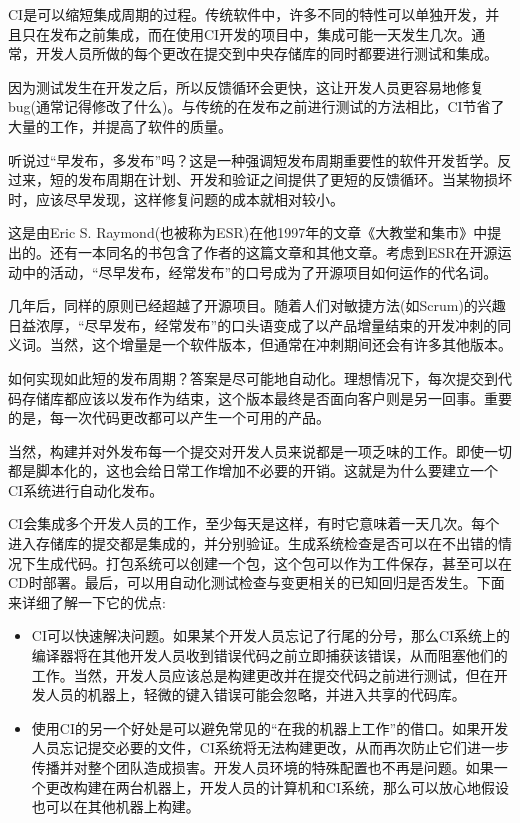 CI是可以缩短集成周期的过程。传统软件中，许多不同的特性可以单独开发，并且只在发布之前集成，而在使用CI开发的项目中，集成可能一天发生几次。通常，开发人员所做的每个更改在提交到中央存储库的同时都要进行测试和集成。

因为测试发生在开发之后，所以反馈循环会更快，这让开发人员更容易地修复bug(通常记得修改了什么)。与传统的在发布之前进行测试的方法相比，CI节省了大量的工作，并提高了软件的质量。


听说过“早发布，多发布”吗？这是一种强调短发布周期重要性的软件开发哲学。反过来，短的发布周期在计划、开发和验证之间提供了更短的反馈循环。当某物损坏时，应该尽早发现，这样修复问题的成本就相对较小。

这是由Eric S. Raymond(也被称为ESR)在他1997年的文章《大教堂和集市》中提出的。还有一本同名的书包含了作者的这篇文章和其他文章。考虑到ESR在开源运动中的活动，“尽早发布，经常发布”的口号成为了开源项目如何运作的代名词。

几年后，同样的原则已经超越了开源项目。随着人们对敏捷方法(如Scrum)的兴趣日益浓厚，“尽早发布，经常发布”的口头语变成了以产品增量结束的开发冲刺的同义词。当然，这个增量是一个软件版本，但通常在冲刺期间还会有许多其他版本。

如何实现如此短的发布周期？答案是尽可能地自动化。理想情况下，每次提交到代码存储库都应该以发布作为结束，这个版本最终是否面向客户则是另一回事。重要的是，每一次代码更改都可以产生一个可用的产品。

当然，构建并对外发布每一个提交对开发人员来说都是一项乏味的工作。即使一切都是脚本化的，这也会给日常工作增加不必要的开销。这就是为什么要建立一个CI系统进行自动化发布。


CI会集成多个开发人员的工作，至少每天是这样，有时它意味着一天几次。每个进入存储库的提交都是集成的，并分别验证。生成系统检查是否可以在不出错的情况下生成代码。打包系统可以创建一个包，这个包可以作为工件保存，甚至可以在CD时部署。最后，可以用自动化测试检查与变更相关的已知回归是否发生。下面来详细了解一下它的优点:

\begin{itemize}
\item 
CI可以快速解决问题。如果某个开发人员忘记了行尾的分号，那么CI系统上的编译器将在其他开发人员收到错误代码之前立即捕获该错误，从而阻塞他们的工作。当然，开发人员应该总是构建更改并在提交代码之前进行测试，但在开发人员的机器上，轻微的键入错误可能会忽略，并进入共享的代码库。

\item 
使用CI的另一个好处是可以避免常见的“在我的机器上工作”的借口。如果开发人员忘记提交必要的文件，CI系统将无法构建更改，从而再次防止它们进一步传播并对整个团队造成损害。开发人员环境的特殊配置也不再是问题。如果一个更改构建在两台机器上，开发人员的计算机和CI系统，那么可以放心地假设也可以在其他机器上构建。
\end{itemize}

